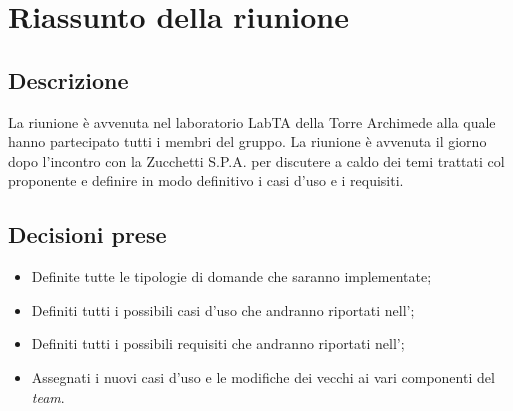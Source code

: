 \section{Riassunto della riunione}
\subsection{Descrizione}
La riunione è avvenuta nel laboratorio LabTA della Torre Archimede alla quale hanno partecipato tutti i membri del gruppo. La riunione è avvenuta il giorno dopo l'incontro con la Zucchetti S.P.A. per discutere a caldo dei temi trattati col proponente e definire in modo definitivo i casi d'uso e i requisiti.
\subsection{Decisioni prese}
\begin{itemize}
\item Definite tutte le tipologie di domande che saranno implementate;
\item Definiti tutti i possibili casi d'uso che andranno riportati nell'\AdR;
\item Definiti tutti i possibili requisiti che andranno riportati nell'\AdR;
\item Assegnati i nuovi casi d'uso e le modifiche dei vecchi ai vari componenti del \textit{team}.
\end{itemize}